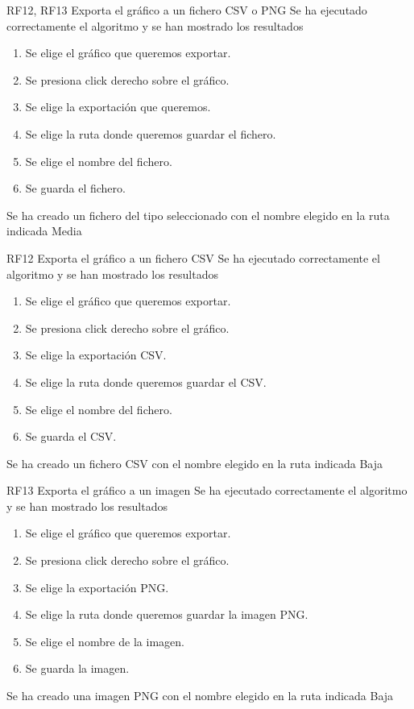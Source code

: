 {RF12, RF13}
{Exporta el gráfico a un fichero CSV o PNG}
{Se ha ejecutado correctamente el algoritmo y se han mostrado los resultados}
{
    \begin{enumerate}
        \def\labelenumi{\arabic{enumi}.}
        \tightlist
        \item Se elige el gráfico que queremos exportar.
        \item Se presiona click derecho sobre el gráfico.
        \item Se elige la exportación que queremos.
        \item Se elige la ruta donde queremos guardar el fichero.
        \item Se elige el nombre del fichero.
        \item Se guarda el fichero.
    \end{enumerate}
}
{Se ha creado un fichero del tipo seleccionado con el nombre elegido en la ruta indicada}
{}
{Media}

{RF12}
{Exporta el gráfico a un fichero CSV}
{Se ha ejecutado correctamente el algoritmo y se han mostrado los resultados}
{
    \begin{enumerate}
        \def\labelenumi{\arabic{enumi}.}
        \tightlist
        \item Se elige el gráfico que queremos exportar.
        \item Se presiona click derecho sobre el gráfico.
        \item Se elige la exportación CSV.
        \item Se elige la ruta donde queremos guardar el CSV.
        \item Se elige el nombre del fichero.
        \item Se guarda el CSV.
    \end{enumerate}
}
{Se ha creado un fichero CSV con el nombre elegido en la ruta indicada}
{}
{Baja}

{RF13}
{Exporta el gráfico a un imagen}
{Se ha ejecutado correctamente el algoritmo y se han mostrado los resultados}
{
    \begin{enumerate}
        \def\labelenumi{\arabic{enumi}.}
        \tightlist
        \item Se elige el gráfico que queremos exportar.
        \item Se presiona click derecho sobre el gráfico.
        \item Se elige la exportación PNG.
        \item Se elige la ruta donde queremos guardar la imagen PNG.
        \item Se elige el nombre de la imagen.
        \item Se guarda la imagen.
    \end{enumerate}
}
{Se ha creado una imagen PNG con el nombre elegido en la ruta indicada}
{}
{Baja}